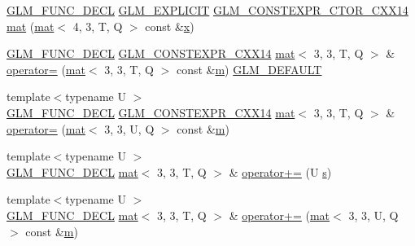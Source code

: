 \begin{DoxyCompactItemize}
\item 
\hyperlink{setup_8hpp_ab2d052de21a70539923e9bcbf6e83a51}{G\+L\+M\+\_\+\+F\+U\+N\+C\+\_\+\+D\+E\+CL} \hyperlink{setup_8hpp_a6c74f5a5e7b134ab69023ff9a30d4d5d}{G\+L\+M\+\_\+\+E\+X\+P\+L\+I\+C\+IT} \hyperlink{setup_8hpp_a0900f9145e68bf6061b6f5e7be3fa751}{G\+L\+M\+\_\+\+C\+O\+N\+S\+T\+E\+X\+P\+R\+\_\+\+C\+T\+O\+R\+\_\+\+C\+X\+X14} \hyperlink{structglm_1_1mat_3_013_00_013_00_01_t_00_01_q_01_4_aa085fc172fa309d9426e85ce0f278d36}{mat} (\hyperlink{structglm_1_1mat}{mat}$<$ 4, 3, T, Q $>$ const \&\hyperlink{_s_d_l__opengl_8h_ad0e63d0edcdbd3d79554076bf309fd47}{x})
\item 
\hyperlink{setup_8hpp_ab2d052de21a70539923e9bcbf6e83a51}{G\+L\+M\+\_\+\+F\+U\+N\+C\+\_\+\+D\+E\+CL} \hyperlink{setup_8hpp_a4dd12abf5e1164bc57f3a34671d03844}{G\+L\+M\+\_\+\+C\+O\+N\+S\+T\+E\+X\+P\+R\+\_\+\+C\+X\+X14} \hyperlink{structglm_1_1mat}{mat}$<$ 3, 3, T, Q $>$ \& \hyperlink{structglm_1_1mat_3_013_00_013_00_01_t_00_01_q_01_4_a9bf859c0e00be258390fdab15e7faaf1}{operator=} (\hyperlink{structglm_1_1mat}{mat}$<$ 3, 3, T, Q $>$ const \&\hyperlink{_s_d_l__opengl__glext_8h_af593500c283bf1a787a6f947f503a5c2}{m}) \hyperlink{setup_8hpp_aefce7051c376a64ba89fa93a9f63bc2c}{G\+L\+M\+\_\+\+D\+E\+F\+A\+U\+LT}
\item 
{\footnotesize template$<$typename U $>$ }\\\hyperlink{setup_8hpp_ab2d052de21a70539923e9bcbf6e83a51}{G\+L\+M\+\_\+\+F\+U\+N\+C\+\_\+\+D\+E\+CL} \hyperlink{setup_8hpp_a4dd12abf5e1164bc57f3a34671d03844}{G\+L\+M\+\_\+\+C\+O\+N\+S\+T\+E\+X\+P\+R\+\_\+\+C\+X\+X14} \hyperlink{structglm_1_1mat}{mat}$<$ 3, 3, T, Q $>$ \& \hyperlink{structglm_1_1mat_3_013_00_013_00_01_t_00_01_q_01_4_a53aae107d0de9b06cf3def3d0645883f}{operator=} (\hyperlink{structglm_1_1mat}{mat}$<$ 3, 3, U, Q $>$ const \&\hyperlink{_s_d_l__opengl__glext_8h_af593500c283bf1a787a6f947f503a5c2}{m})
\item 
{\footnotesize template$<$typename U $>$ }\\\hyperlink{setup_8hpp_ab2d052de21a70539923e9bcbf6e83a51}{G\+L\+M\+\_\+\+F\+U\+N\+C\+\_\+\+D\+E\+CL} \hyperlink{structglm_1_1mat}{mat}$<$ 3, 3, T, Q $>$ \& \hyperlink{structglm_1_1mat_3_013_00_013_00_01_t_00_01_q_01_4_abf9da018243788a6fe452e4bdf18526d}{operator+=} (U \hyperlink{_s_d_l__opengl_8h_a4af680a6c683f88ed67b76f207f2e6e4}{s})
\item 
{\footnotesize template$<$typename U $>$ }\\\hyperlink{setup_8hpp_ab2d052de21a70539923e9bcbf6e83a51}{G\+L\+M\+\_\+\+F\+U\+N\+C\+\_\+\+D\+E\+CL} \hyperlink{structglm_1_1mat}{mat}$<$ 3, 3, T, Q $>$ \& \hyperlink{structglm_1_1mat_3_013_00_013_00_01_t_00_01_q_01_4_a52cc749283b195a2ad28964519032bd4}{operator+=} (\hyperlink{structglm_1_1mat}{mat}$<$ 3, 3, U, Q $>$ const \&\hyperlink{_s_d_l__opengl__glext_8h_af593500c283bf1a787a6f947f503a5c2}{m})

\end{DoxyCompactItemize}
